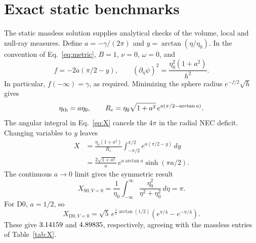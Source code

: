 \section{Exact static benchmarks}
\label{app:static}

The static massless solution supplies analytical checks of the volume,
local and null-ray measures. Define $a=-\gamma/(2\pi)$ and
$y=\arctan(\eta/\eta_0)$. In the convention of Eq.~\eqref{eq:metric},
$B=1$, $\nu=0$, $\omega=0$, and
\begin{equation}
f=-2a(\pi/2-y),\qquad
(\partial_\eta\psi)^2=\frac{\eta_0^2(1+a^2)}{h^2}.
\label{eq:static-fields}
\end{equation}
In particular, $f(-\infty)=\gamma$, as required. Minimizing the sphere
radius $e^{-f/2}\sqrt h$ gives
\begin{equation}
\eta_{\rm th}=a\eta_0,\qquad
R_e=\eta_0\sqrt{1+a^2}\,e^{a(\pi/2-\arctan a)}.
\label{eq:static-throat}
\end{equation}
The angular integral in Eq.~\eqref{eq:X} cancels the $4\pi$ in the
radial NEC deficit. Changing variables to $y$ leaves
\begin{equation}
\begin{split}
X&=\frac{\eta_0(1+a^2)}{R_e}
       \int_{-\pi/2}^{\pi/2} e^{a(\pi/2-y)}\,dy\\
 &=\frac{2\sqrt{1+a^2}}{a}\,e^{a\arctan a}\sinh(\pi a/2).
\end{split}
\label{eq:static-X}
\end{equation}
The continuous $a\to0$ limit gives the symmetric result
\begin{equation}
X_{\mathrm{S0},V=0}=\frac{1}{\eta_0}
 \int_{-\infty}^{\infty}\frac{\eta_0^2}{\eta^2+\eta_0^2}\,d\eta=\pi.
\label{eq:ellis-X}
\end{equation}
For D0, $a=1/2$, so
\begin{equation}
X_{\mathrm{D0},V=0}=\sqrt5\,e^{\frac12\arctan(1/2)}
 \left(e^{\pi/4}-e^{-\pi/4}\right).
\label{eq:drainhole-X}
\end{equation}
These give $3.14159$ and $4.89835$, respectively,
agreeing with the massless entries of Table~\ref{tab:X}.


